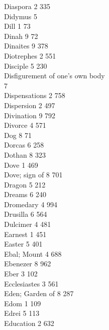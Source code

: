 Diaspora \hfill 2 \quad \phantom{0}335\\
Didymus \hfill 5 \\
Dill \hfill 1 \quad \phantom{0}\phantom{0}73\\
Dinah \hfill 9 \quad \phantom{0}\phantom{0}72\\
Dinaites \hfill 9 \quad \phantom{0}378\\
Diotrephes \hfill 2 \quad \phantom{0}551\\
Disciple \hfill 5 \quad \phantom{0}230\\
Disfigurement of one’s own body \\ \mbox{} \hfill 7 \\
Dispensations \hfill 2 \quad \phantom{0}758\\
Dispersion \hfill 2 \quad \phantom{0}497\\
Divination \hfill 9 \quad \phantom{0}792\\
Divorce \hfill 4 \quad \phantom{0}571\\
Dog \hfill 8 \quad \phantom{0}\phantom{0}71\\
Dorcas \hfill 6 \quad \phantom{0}258\\
Dothan \hfill 8 \quad \phantom{0}323\\
Dove \hfill 1 \quad \phantom{0}469\\
Dove; sign of \hfill 8 \quad \phantom{0}701\\
Dragon \hfill 5 \quad \phantom{0}212\\
Dreams \hfill 6 \quad \phantom{0}240\\
Dromedary \hfill 4 \quad \phantom{0}994\\
Drusilla \hfill 6 \quad \phantom{0}564\\
Dulcimer \hfill 4 \quad \phantom{0}481\\
Earnest \hfill 1 \quad \phantom{0}451\\
Easter \hfill 5 \quad \phantom{0}401\\
Ebal; Mount \hfill 4 \quad \phantom{0}688\\
Ebenezer \hfill 8 \quad \phantom{0}962\\
Eber \hfill 3 \quad \phantom{0}102\\
Ecclesiastes \hfill 3 \quad \phantom{0}561\\
Eden; Garden of \hfill 8 \quad \phantom{0}287\\
Edom \hfill 1 \quad \phantom{0}109\\
Edrei \hfill 5 \quad \phantom{0}113\\
Education \hfill 2 \quad \phantom{0}632\\
